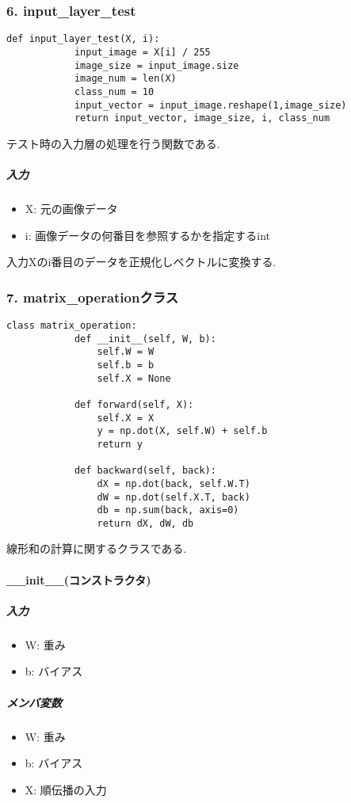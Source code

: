\documentclass[a4j, titlepage]{jarticle}
\begin{document}
    \subsubsection*{6. input\_layer\_test}
        \begin{lstlisting}[caption=テストの入力層の処理,label=fuga]
        def input_layer_test(X, i):
            input_image = X[i] / 255
            image_size = input_image.size
            image_num = len(X)
            class_num = 10
            input_vector = input_image.reshape(1,image_size)
            return input_vector, image_size, i, class_num
        \end{lstlisting}
        テスト時の入力層の処理を行う関数である.
            \subparagraph*{入力}
            \begin{itemize}
                \item X: 元の画像データ
                \item i: 画像データの何番目を参照するかを指定するint
            \end{itemize}
            入力Xのi番目のデータを正規化しベクトルに変換する.

    \subsubsection*{7. matrix\_operationクラス}
        \begin{lstlisting}[caption=線形和の計算 ,label=fuga]
        class matrix_operation:
            def __init__(self, W, b):
                self.W = W
                self.b = b
                self.X = None

            def forward(self, X):
                self.X = X
                y = np.dot(X, self.W) + self.b
                return y

            def backward(self, back):
                dX = np.dot(back, self.W.T)
                dW = np.dot(self.X.T, back)
                db = np.sum(back, axis=0)
                return dX, dW, db
        \end{lstlisting}
        線形和の計算に関するクラスである.
        \paragraph*{\_\_init\_\_(コンストラクタ)}
            \subparagraph*{入力}
            \begin{itemize}
                \item W: 重み
                \item b: バイアス
            \end{itemize}
            \subparagraph*{メンバ変数}
            \begin{itemize}
                \item W: 重み
                \item b: バイアス
                \item X: 順伝播の入力
            \end{itemize}
\end{document}
